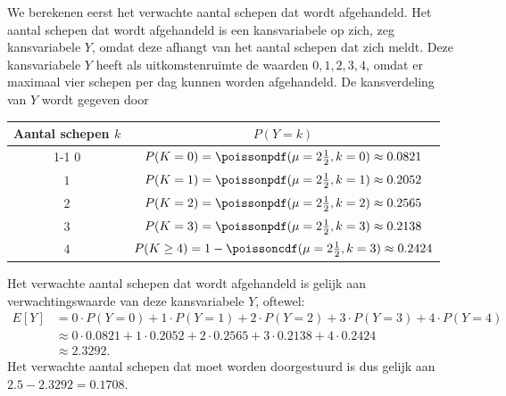\begin{enumerate}[label=(\alph*)]
{        We berekenen eerst het verwachte aantal schepen dat wordt afgehandeld.
        Het aantal schepen dat wordt afgehandeld is een kansvariabele op zich, zeg kansvariabele $Y$, omdat deze afhangt van het aantal schepen dat zich meldt.
        Deze kansvariabele $Y$ heeft als uitkomstenruimte de waarden $0, 1, 2, 3, 4$, omdat er maximaal vier schepen per dag kunnen worden afgehandeld.
        De kansverdeling van $Y$ wordt gegeven door
        \begin{center}
            \begin{tabular}{cc}
                \toprule
                    {\bfseries Aantal schepen $k$} & $P(Y=k)$\\
                \cmidrule{1-1} \cmidrule{2-2}
                    $0$ & $P(K=0) = \poissonpdf(\mu=2\frac{1}{2}, k=0) \approx 0.0821$ \\
                    $1$ & $P(K=1) = \poissonpdf(\mu=2\frac{1}{2}, k=1) \approx 0.2052$ \\
                    $2$ & $P(K=2) = \poissonpdf(\mu=2\frac{1}{2}, k=2) \approx 0.2565$ \\
                    $3$ & $P(K=3) = \poissonpdf(\mu=2\frac{1}{2}, k=3) \approx 0.2138$ \\
                    $4$ & $P(K \ge 4) = 1-\poissoncdf(\mu=2\frac{1}{2}, k=3) \approx 0.2424$ \\
                \bottomrule
            \end{tabular}
        \end{center}
        Het verwachte aantal schepen dat wordt afgehandeld is gelijk aan verwachtingswaarde van deze kansvariabele $Y$, oftewel:
        \begin{align*}
            E[Y]    &= 0 \cdot P(Y = 0) + 1 \cdot P(Y = 1) + 2 \cdot P(Y = 2) + 3 \cdot P(Y = 3) + 4 \cdot P(Y = 4) \\
                    &\approx 0 \cdot 0.0821 + 1 \cdot 0.2052 + 2 \cdot 0.2565 + 3 \cdot 0.2138 + 4 \cdot 0.2424 \\
                    &\approx 2.3292.
        \end{align*}
        Het verwachte aantal schepen dat moet worden doorgestuurd is dus gelijk aan $2.5 - 2.3292 = 0.1708$.
    }


\end{enumerate}
